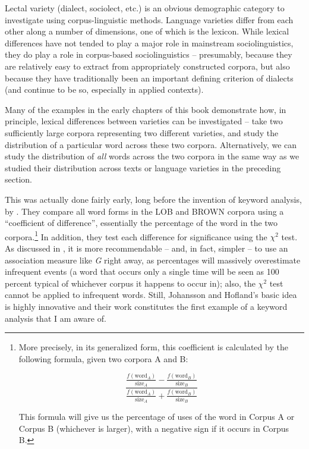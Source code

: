 Lectal variety  (dialect, sociolect, etc.) is an obvious demographic  category to investigate using corpus\hyp{}linguistic methods. Language varieties  differ from each other along a number of dimensions, one of which is the lexicon.  While lexical differences have not tended to play a major role in mainstream sociolinguistics,  they do play a role in corpus\hyp{}based sociolinguistics  -- presumably, because they are relatively easy to extract  from appropriately constructed corpora, but also because they have traditionally been an important defining criterion of dialects (and continue to be so, especially in applied contexts).\pagebreak

Many of the examples in the early chapters of this book demonstrate how, in principle, lexical differences between varieties  can be investigated -- take two sufficiently large  corpora representing two different varieties, and study the distribution  of a particular word across these two corpora. Alternatively, we can study the distribution of \textit{all} words across the two corpora in the same way as we studied their distribution across texts or language varieties in the preceding section.

This was actually done fairly early, long before the invention of keyword  analysis, by \citet{johansson_frequency_1989}. They compare all word forms in the LOB  and BROWN  corpora using a ``coefficient of difference'', essentially the percentage of the word in the two corpora.\footnote{More precisely, in its generalized form, this coefficient is calculated by the following formula, given two corpora A and B:

\[\frac{ \frac{f ( \text{word}_A )}{\text{size}_A} - \frac{f ( \text{word}_B )}{\text{size}_B}}{ \frac{f ( \text{word}_A )}{ \text{size}_A} + \frac{f ( \text{word}_B )}{\text{size}_B}}\]

This formula will give us the percentage of uses of the word in Corpus A or Corpus B (whichever is larger), with a negative sign if it occurs in Corpus B.} In addition, they test each difference for significance using the $\chi^2$  test. As discussed in , it is more recommendable -- and, in fact, simpler -- to use an association  measure  like \emph{G} right away, as percentages will massively overestimate infrequent events (a word that occurs only a single time will be seen as 100 percent typical of whichever corpus it happens to occur in); also, the $\chi^2$  test cannot be applied to infrequent words. Still, Johansson and Hofland's basic idea is highly innovative and their work constitutes the first example of a keyword  analysis that I am aware of.

